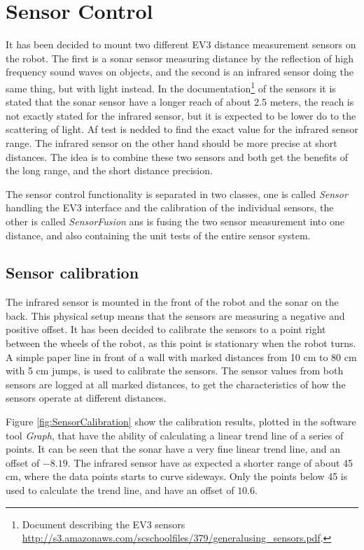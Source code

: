 
\section{Sensor Control}
\label{sec:sensorControl}

It has been decided to mount two different EV3 distance measurement sensors on the robot.
The first is a sonar sensor measuring distance by the reflection of high frequency sound waves on objects, and the second is an infrared sensor doing the same thing, but with light instead.
In the documentation\footnote{Document describing the EV3 sensors \url{http://s3.amazonaws.com/scschoolfiles/379/generalusing_sensors.pdf}.} of the sensors it is stated that the sonar sensor have a longer reach of about 2.5 meters, the reach is not exactly stated for the infrared sensor, but it is expected to be lower do to the scattering of light.
Af test is nedded to find the exact value for the infrared sensor range.
The infrared sensor on the other hand should be more precise at short distances.
The idea is to combine these two sensors and both get the benefits of the long range, and the short distance precision.

The sensor control functionality is separated in two classes, one is called \emph{Sensor} handling the EV3 interface and the calibration of the individual sensors, the other is called \emph{SensorFusion} ans is fusing the two sensor measurement into one distance, and also containing the unit tests of the entire sensor system.

\subsection{Sensor calibration}
\label{sec:SensorCalibration}

The infrared sensor is mounted in the front of the robot and the sonar on the back.
This physical setup means that the sensors are measuring a negative and positive offset.
It has been decided to calibrate the sensors to a point right between the wheels of the robot, as this point is stationary when the robot turns.
A simple paper line in front of a wall with marked distances from 10 cm to 80 cm with 5 cm jumps, is used to calibrate the sensors.
The sensor values from both sensors are logged at all marked distances, to get the characteristics of how the sensors operate at different distances.

Figure \ref{fig:SensorCalibration} show the calibration results, plotted in the software tool \emph{Graph}, that have the ability of calculating a linear trend line of a series of points.
It can be seen that the sonar have a very fine linear trend line, and an offset of $ -8.19 $.
The infrared sensor have as expected a shorter range of about 45 cm, where the data points starts to curve sideways.
Only the points below 45 is used to calculate the trend line, and have an offset of $ 10.6 $.

